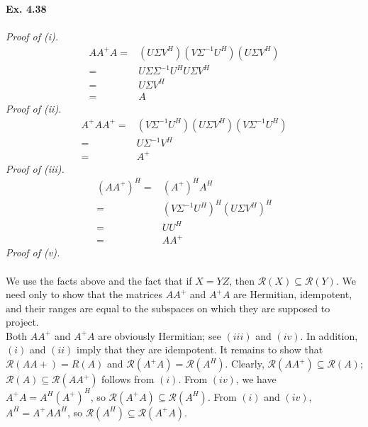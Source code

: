 \documentclass[letterpaper,12pt]{article}
\theoremstyle{definition}
\begin{document}
\begin{spacing}{1.3}{}
\textbf{Ex. 4.38}\\\\
\emph{Proof of (i).}
\begin{align*}
  A A^{+} A =& (U \Sigma V^H) (V \Sigma^{-1} U^H) (U \Sigma V^H) \\
            =& U \Sigma \Sigma^{-1} U^H U \Sigma V^H \\
            =& U \Sigma V^H \\
            =& A
\end{align*}
\emph{Proof of (ii).}
\begin{align*}
  A^{+} A A^{+} =& (V \Sigma^{-1} U^H) (U \Sigma V^H) (V \Sigma^{-1} U^H) \\
                =& U \Sigma^{-1} V^H \\
                =& A^{+}
\end{align*}
\emph{Proof of (iii).}
\begin{align*}
  (AA^{+})^H =& (A^{+})^H A^H \\
             =& (V \Sigma^{-1} U^H)^H (U \Sigma V^H)^H \\
             =& U U^H \\
             =& A A^{+}
\end{align*}
\emph{Proof of (v).} \\\\
We use the facts above and the fact that if $X=YZ$, then $ \mathcal{R}(X) \subseteq \mathcal{R}(Y)$. We need only to show that the matrices $AA^{+}$ and $A^{+}A$ are Hermitian, idempotent, and their ranges are equal to the subspaces on which they are supposed to project. \\

Both $AA^{+}$ and $A^{+}A$ are obviously Hermitian; see $(iii)$ and $(iv)$. In addition, $(i)$ and $(ii)$ imply that they are idempotent. It remains to show that $\mathcal{R}(AA+)=R(A)$ and $\mathcal{R}(A^{+}A)=\mathcal{R}(A^H)$. Clearly, $\mathcal{R}(AA^{+}) \subseteq \mathcal{R}(A)$; $\mathcal{R}(A) \subseteq \mathcal{R}(A A^{+})$ follows from $(i)$. From $(iv)$, we have $A^{+}A=A^H (A^{+})^H$, so $\mathcal{R}(A^{+}A) \subseteq \mathcal{R}(A^H)$. From $(i)$ and $(iv)$, $A^H=A^{+}AA^H$, so $\mathcal{R}(A^H) \subseteq \mathcal{R}(A^{+}A)$.



\end{spacing}
\end{document}
